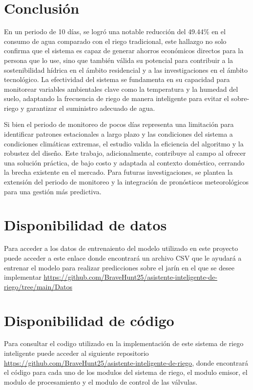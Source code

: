 \documentclass[pdflatex,sn-mathphys-num]{sn-jnl}%
\theoremstyle{thmstyleone}%
\theoremstyle{thmstyletwo}%
\theoremstyle{thmstylethree}%
\begin{document}
\begin{multicols}{2}
\section*{Conclusión}

En un periodo de 10 días, se logró una notable reducción del 49.44\% en el consumo de agua comparado con el riego tradicional, este hallazgo no solo confirma que el sistema es capaz de generar ahorros económicos directos para la persona que lo use, sino que también válida su potencial para contribuir a la sostenibilidad hídrica en el ámbito residencial y a las investigaciones en el ámbito tecnológico. La efectividad del sistema se fundamenta en su capacidad para monitorear variables ambientales clave como la temperatura y la humedad del suelo, adaptando la frecuencia de riego de manera inteligente para evitar el sobre-riego y garantizar el suministro adecuado de agua.

Si bien el periodo de monitoreo de pocos días representa una limitación para identificar patrones estacionales a largo plazo y las condiciones del sistema a condiciones climáticas extremas, el estudio valida la eficiencia del algoritmo y la robustez del diseño. Este trabajo, adicionalmente, contribuye al campo al ofrecer una solución práctica, de bajo costo y adaptada al contexto doméstico, cerrando la brecha existente en el mercado. Para futuras investigaciones, se plantea la extensión del periodo de monitoreo y la integración de pronósticos meteorológicos para una gestión más predictiva.

\section*{Disponibilidad de datos}
Para acceder a los datos de entrenaiento del modelo utilizado en este proyecto puede acceder a este enlace donde encontrará un archivo CSV que le ayudará a entrenar el modelo para realizar predicciones sobre el jarín en el que se desee implementar \url{https://github.com/BraveHunt25/asistente-inteligente-de-riego/tree/main/Datos}

\section*{Disponibilidad de código}
Para consultar el codigo utilizado en la implementación de este sistema de riego inteligente puede acceder al siguiente repositorio \url{https://github.com/BraveHunt25/asistente-inteligente-de-riego}, donde encontrará el código para cada uno de los modulos del sistema de riego, el modulo emisor, el modulo de procesamiento y el modulo de control de las válvulas.


\end{multicols}
\end{document}
